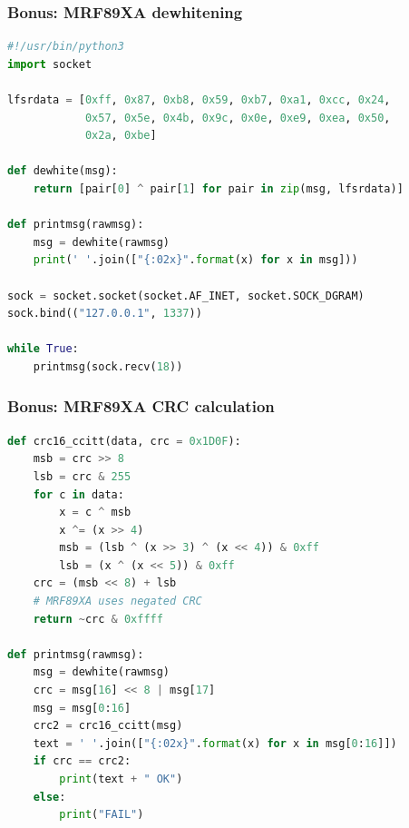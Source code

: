\documentclass[aspectratio=169]{beamer}
\begin{document}
\begin{frame}[fragile]
	\frametitle{Bonus: MRF89XA dewhitening}

\begin{scriptsize}
\begin{lstlisting}[frame=single,showstringspaces=false,language=Python,commentstyle=\color{commentsColor}\textit,keywordstyle=\color{keywordsColor}\bfseries,stringstyle=\color{stringColor}]
#!/usr/bin/python3
import socket

lfsrdata = [0xff, 0x87, 0xb8, 0x59, 0xb7, 0xa1, 0xcc, 0x24,
            0x57, 0x5e, 0x4b, 0x9c, 0x0e, 0xe9, 0xea, 0x50,
            0x2a, 0xbe]

def dewhite(msg):
    return [pair[0] ^ pair[1] for pair in zip(msg, lfsrdata)]

def printmsg(rawmsg):
    msg = dewhite(rawmsg)
    print(' '.join(["{:02x}".format(x) for x in msg]))

sock = socket.socket(socket.AF_INET, socket.SOCK_DGRAM)
sock.bind(("127.0.0.1", 1337))

while True:
    printmsg(sock.recv(18))
\end{lstlisting}
\end{scriptsize}
\end{frame}

\begin{frame}[fragile]
	\frametitle{Bonus: MRF89XA CRC calculation}

\begin{scriptsize}
\begin{lstlisting}[frame=single,showstringspaces=false,language=Python,commentstyle=\color{commentsColor}\textit,keywordstyle=\color{keywordsColor}\bfseries,stringstyle=\color{stringColor}]
def crc16_ccitt(data, crc = 0x1D0F):
    msb = crc >> 8
    lsb = crc & 255
    for c in data:
        x = c ^ msb
        x ^= (x >> 4)
        msb = (lsb ^ (x >> 3) ^ (x << 4)) & 0xff
        lsb = (x ^ (x << 5)) & 0xff
    crc = (msb << 8) + lsb
    # MRF89XA uses negated CRC
    return ~crc & 0xffff

def printmsg(rawmsg):
    msg = dewhite(rawmsg)
    crc = msg[16] << 8 | msg[17]
    msg = msg[0:16]
    crc2 = crc16_ccitt(msg)
    text = ' '.join(["{:02x}".format(x) for x in msg[0:16]])
    if crc == crc2:
        print(text + " OK")
    else:
        print("FAIL")
\end{lstlisting}
\end{scriptsize}
\end{frame}
\end{document}
